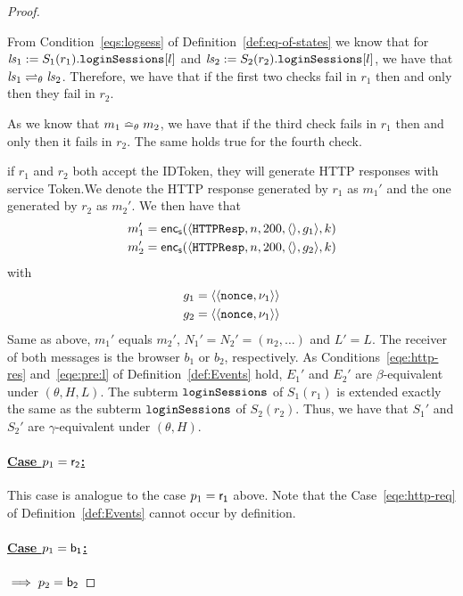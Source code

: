 \documentclass[letterpaper,onecolumn,10pt]{article}
\begin{document}
\begin{proof}
\begin{itemize}
      From Condition~\ref{eqs:logsess} of 
      Definition~\ref{def:eq-of-states} we know that for 
      $\mathit{ls}_1 := S_1(r_1).\mathtt{loginSessions}[l]$ and 
      $\mathit{ls}_2 := S_2(r_2).\mathtt{loginSessions}[l]$, 
      we have that $\mathit{ls}_1 \rightleftharpoons_{\theta} \mathit{ls}_2$.
      Therefore, we have that if the first two checks fail in
      $r_1$ then and only then they fail in $r_2$.

      As we know that $m_1 \bumpeq_{\theta} m_2$, we have 
      that if the third check fails in $r_1$ then and only 
      then it fails in $r_2$. The same holds true for the 
      fourth check.

      if $r_1$ and $r_2$ both accept the IDToken, they will 
      generate HTTP responses with service Token.We denote 
      the HTTP response generated by $r_1$ as $m_1'$ and the
      one generated by $r_2$ as $m_2'$. We then have that
      \begin{align*}
        m_1' = \mathsf{enc}_\mathsf{s}(\langle\mathtt{HTTPResp},n,200,\langle\rangle,g_1\rangle,k) \\
        m_2' = \mathsf{enc}_\mathsf{s}(\langle\mathtt{HTTPResp},n,200,\langle\rangle,g_2\rangle,k)
      \end{align*}
      with
      \begin{align*}
        g_1 = \langle\langle\mathtt{nonce}, \nu_1\rangle\rangle \\
        g_2 = \langle\langle\mathtt{nonce}, \nu_1\rangle\rangle
      \end{align*}
      Same as above, $m_1'$ equals $m_2'$, $N_1' = N_2' = 
      (n_2, \dots)$ and $L' = L$. 
      The receiver of both messages is the browser $b_1$ or 
      $b_2$, respectively. As Conditions~\ref{eqe:http-res} 
      and~\ref{eqe:pre:l} of Definition~\ref{def:Events} hold, 
      $E_1'$ and $E_2'$ are $\beta$-equivalent under 
      $(\theta,H,L)$. The subterm $\mathtt{loginSessions}$ of 
      $S_1(r_1)$ is extended exactly the same as the subterm 
      $\mathtt{loginSessions}$ of $S_2(r_2)$. Thus, we have that 
      $S_1'$ and $S_2'$ are $\gamma$-equivalent under 
      $(\theta,H)$.
  \end{itemize}

  \paragraph{\underline{Case $p_1 = \mathsf{r_2}$:}} This case is
  analogue to the case $p_1 = \mathsf{r_1}$ above. Note that the
  Case~\ref{eqe:http-req} of Definition~\ref{def:Events} 
  cannot occur by definition.

  \paragraph{\underline{Case $p_1 = \mathsf{b_1}$:}} 
  $\implies p_2 = \mathsf{b_2}$ 


\end{proof}
\end{document}
